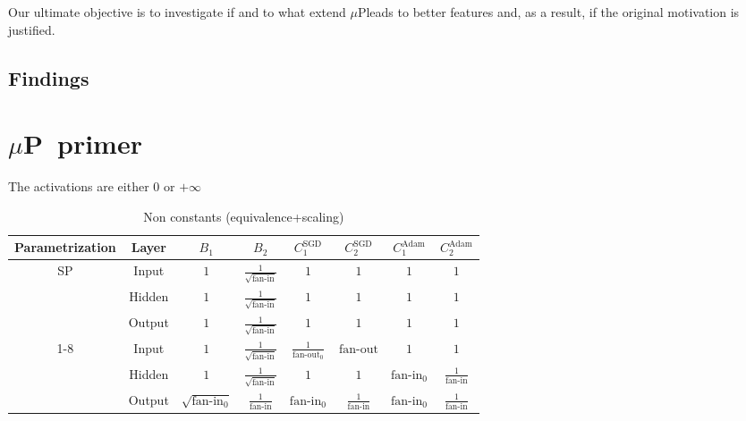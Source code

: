 \documentclass{article}
\newcommand{\mup}{$\mu$P}
\newcommand{\fanin}{\text{fan-in}}
\newcommand{\fanout}{\text{fan-out}}
\begin{document}
Our ultimate objective is to investigate if and to what extend \mup leads to better features and, as a result, if the original motivation is justified.

\subsection{Findings}

\section{\mup\ primer}
The activations are either $0$ or $+\infty$
\begin{table}[h!]
\footnotesize
\Centering
\begin{tabular}{cccccccc}
\toprule
Parametrization & Layer & $B_1$ & $B_2$ & $C^{\text{SGD}}_1$ & $C^{\text{SGD}}_2$ & $C^{\text{Adam}}_1$ & $C^{\text{Adam}}_2$\\
\midrule
\multirow{3}{*}{SP} & Input & $1$ & $\frac{1}{\sqrt{\fanin}}$ & $1$ & $1$ & $1$ & $1$\\
& Hidden & $1$ & $\frac{1}{\sqrt{\fanin}}$ & $1$ & $1$ & $1$ & $1$\\
& Output & $1$ & $\frac{1}{\sqrt{\fanin}}$ & $1$ & $1$ & $1$ & $1$\\
\cmidrule{1-8}
\multirow{3}{*}{$\mu$P} & Input & $1$ & $\frac{1}{\sqrt{\fanin}}$ & $\frac{1}{\fanout_0}$ & $\fanout$ & $1$ & $1$ \\
& Hidden & $1$ & $\frac{1}{\sqrt{\fanin}}$ & $1$ & $1$ & $\fanin_0$ & $\frac{1}{\fanin}$\\
& Output & $\sqrt{\fanin_0}$ & $\frac{1}{\fanin}$ & $\fanin_0$ & $\frac{1}{\fanin}$ & $\fanin_0$ & $\frac{1}{\fanin}$\\
\bottomrule
\end{tabular}
\caption{Non constants (equivalence+scaling)}
\end{table}
\end{document}
